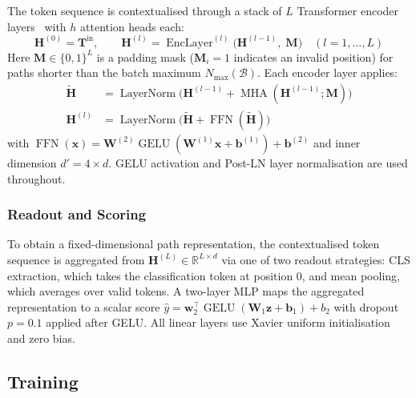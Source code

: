 \documentclass[runningheads]{llncs}
\begin{document}
\label{sec:transformer-encoder}

The token sequence is contextualised through a stack of $L$
Transformer encoder layers~\cite{vaswani2017attention} with $h$ attention heads each:
\begin{equation}
  \mathbf{H}^{(0)} = \mathbf{T}^{\text{in}},\qquad
  \mathbf{H}^{(l)} = \operatorname{EncLayer}^{(l)}\bigl(\mathbf{H}^{(l-1)},\; \mathbf{M}\bigr)
  \quad (l = 1, \ldots, L)
  \label{eq:transformer}
\end{equation}
Here $\mathbf{M} \in \{0, 1\}^{L}$ is a padding mask ($\mathbf{M}_i = 1$ indicates an
invalid position) for paths shorter than the batch maximum $N_{\max}(\mathcal{B})$.
Each encoder layer applies:
\begin{align}
  \tilde{\mathbf{H}} &= \operatorname{LayerNorm}\bigl(
  \mathbf{H}^{(l-1)} + \operatorname{MHA}(\mathbf{H}^{(l-1)}; \mathbf{M})\bigr)
  \label{eq:attn}\\
  \mathbf{H}^{(l)} &= \operatorname{LayerNorm}\bigl(
  \tilde{\mathbf{H}} + \operatorname{FFN}(\tilde{\mathbf{H}})\bigr)
  \label{eq:ffn}
\end{align}
with $\operatorname{FFN}(\mathbf{x}) = \mathbf{W}^{(2)} \operatorname{GELU}(\mathbf{W}^{(1)} \mathbf{x} + \mathbf{b}^{(1)}) + \mathbf{b}^{(2)}$
and inner dimension $d' = 4 \times d$.
GELU \cite{hendrycks2016gaussian} activation
and Post-LN layer normalisation are used throughout.

\subsubsection{Readout and Scoring}

\label{sec:readout}

To obtain a fixed-dimensional path representation, the contextualised token
sequence is aggregated from
$\mathbf{H}^{(L)} \in \mathbb{R}^{L \times d}$
via one of two readout strategies: CLS extraction, which takes the
classification token at position 0, and mean pooling, which averages
over valid tokens.
A two-layer MLP maps the aggregated representation to a scalar score
$\hat{y} = \mathbf{w}_2^{\top} \operatorname{GELU}(\mathbf{W}_1 \mathbf{z} + \mathbf{b}_1) + b_2$
with dropout $p = 0.1$ applied after GELU.
All linear layers use Xavier
uniform initialisation and zero bias.

\subsection{Training}
\end{document}
